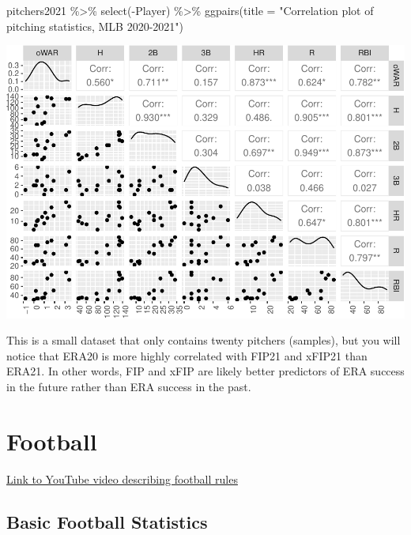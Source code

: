 \documentclass[
  11pt,
]{book}
\newenvironment{Shaded}{\begin{snugshade}}{\end{snugshade}}
\newcommand{\AttributeTok}[1]{\textcolor[rgb]{0.77,0.63,0.00}{#1}}
\newcommand{\FunctionTok}[1]{\textcolor[rgb]{0.00,0.00,0.00}{#1}}
\newcommand{\NormalTok}[1]{#1}
\newcommand{\SpecialCharTok}[1]{\textcolor[rgb]{0.00,0.00,0.00}{#1}}
\newcommand{\StringTok}[1]{\textcolor[rgb]{0.31,0.60,0.02}{#1}}
\theoremstyle{definition}
\theoremstyle{definition}
\theoremstyle{definition}
\theoremstyle{definition}
\theoremstyle{remark}
\begin{document}
\begin{Shaded}
\begin{Highlighting}[]
\NormalTok{pitchers2021 }\SpecialCharTok{\%\textgreater{}\%}
    \FunctionTok{select}\NormalTok{(}\SpecialCharTok{{-}}\NormalTok{Player) }\SpecialCharTok{\%\textgreater{}\%}
    \FunctionTok{ggpairs}\NormalTok{(}\AttributeTok{title =} \StringTok{"Correlation plot of pitching statistics, MLB 2020{-}2021"}\NormalTok{)}
\end{Highlighting}
\end{Shaded}

\includegraphics{series_files/figure-latex/unnamed-chunk-18-1.pdf}

This is a small dataset that only contains twenty pitchers (samples), but you will notice that ERA20 is more highly correlated with FIP21 and xFIP21 than ERA21. In other words, FIP and xFIP are likely better predictors of ERA success in the future rather than ERA success in the past.

\vfill
\newpage

\hypertarget{football}{%
\section{Football}\label{football}}

\href{https://www.youtube.com/watch?v=Ddwp1HyEFRE}{Link to YouTube video describing football rules}

\hypertarget{basic-football-statistics}{%
\subsection{Basic Football Statistics}\label{basic-football-statistics}}
\end{document}
